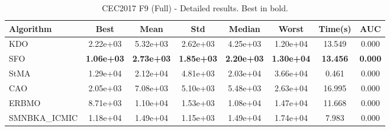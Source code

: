 \begin{table}[H]
\centering\small
\caption{CEC2017 F9 (Full) - Detailed results. Best in bold.}
\label{tab:cec2017_F9}
\begin{tabular}{lccccccc}
\toprule
\textbf{Algorithm} & \textbf{Best} & \textbf{Mean} & \textbf{Std} & \textbf{Median} & \textbf{Worst} & \textbf{Time(s)} & \textbf{AUC} \\
\midrule
KDO & 2.22e+03 & 5.32e+03 & 2.62e+03 & 4.25e+03 & 1.20e+04 & 13.549 & 0.000 \\
SFO & \textbf{1.06e+03} & \textbf{2.73e+03} & \textbf{1.85e+03} & \textbf{2.20e+03} & \textbf{1.30e+04} & \textbf{13.456} & \textbf{0.000} \\
StMA & 1.29e+04 & 2.12e+04 & 4.81e+03 & 2.03e+04 & 3.66e+04 & 0.461 & 0.000 \\
CAO & 2.05e+03 & 7.08e+03 & 5.10e+03 & 5.48e+03 & 2.63e+04 & 16.995 & 0.000 \\
ERBMO & 8.71e+03 & 1.10e+04 & 1.53e+03 & 1.08e+04 & 1.47e+04 & 11.668 & 0.000 \\
SMNBKA_ICMIC & 1.18e+04 & 1.49e+04 & 1.15e+03 & 1.49e+04 & 1.74e+04 & 7.983 & 0.000 \\
\bottomrule
\end{tabular}
\end{table}
